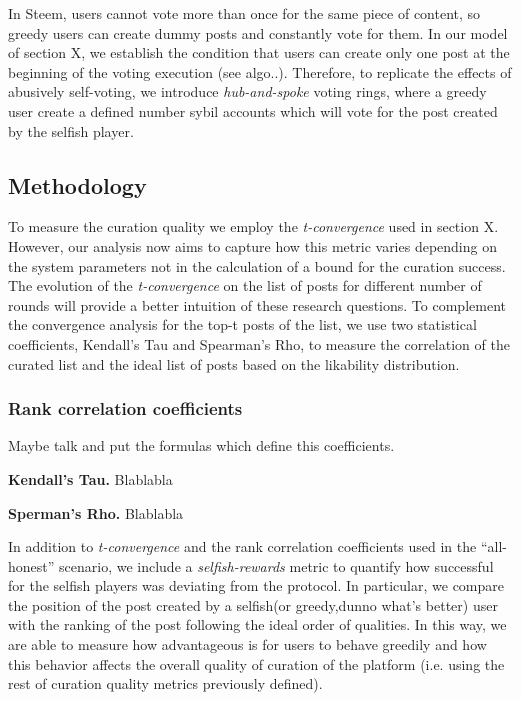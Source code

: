  In Steem, users cannot vote more than once for the same piece of content, so greedy users can create dummy posts and constantly vote for them.
In our model of section X, we establish the condition that users can create only one post at the beginning of the voting execution (see algo..).
 Therefore, to replicate the effects of abusively self-voting, we introduce \textit{hub-and-spoke} voting rings, where a greedy user create a defined number sybil accounts which will vote for the post created by the selfish player.


\subsection{Methodology}

To measure the curation quality we employ the \textit{t-convergence} used in section X. However, our analysis now aims to capture how this metric varies depending on the system parameters not in the calculation of a bound for the curation success.
The evolution of the \textit{t-convergence} on the list of posts for different number of rounds will provide a better intuition of these research questions.
To complement the convergence analysis for the top-t posts of the list, we use two statistical coefficients, Kendall's Tau and Spearman's Rho, to measure the correlation of the curated list and the ideal list of posts based on the likability distribution.

\subsubsection*{Rank correlation coefficients}
Maybe talk and put the formulas which define this coefficients.

\textbf{Kendall's Tau.} Blablabla

\textbf{Sperman's Rho.} Blablabla

In addition to \textit{t-convergence} and the rank correlation coefficients used in the ``all-honest'' scenario, we include a \textit{selfish-rewards} metric to quantify how successful for the selfish players was deviating from the protocol. 
In particular, we compare the position of the post created by a selfish(or greedy,dunno what's better) user with the ranking of the post following the ideal order of qualities. In this way, we are able to measure how advantageous is for users to behave greedily and how this behavior affects the overall quality of curation of the platform (i.e. using the rest of curation quality metrics previously defined).


